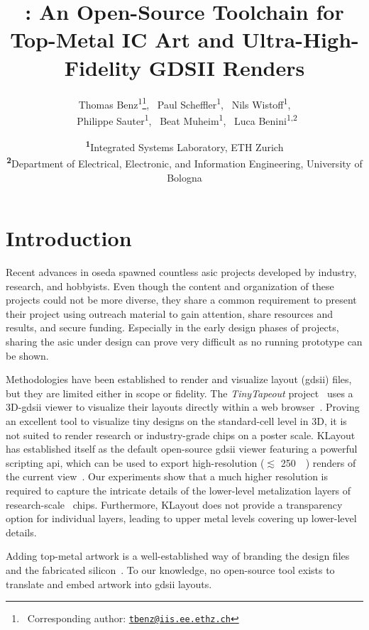 \documentclass[a4paper, 10pt, unnumberedsections, twoside]{LTJournalArticle}
\title{{\artistic}: An Open-Source Toolchain for Top-Metal IC Art and Ultra-High-Fidelity GDSII Renders}
\author{%
    Thomas Benz\textsuperscript{1}\thanks{~Corresponding author: \href{mailto:tbenz@iis.ee.ethz.ch}{\tt tbenz@iis.ee.ethz.ch}}, \
    Paul Scheffler\textsuperscript{1}, \
    Nils Wistoff\textsuperscript{1},\\ \
    Philippe Sauter\textsuperscript{1}, \
    Beat Muheim\textsuperscript{1}, \
    Luca Benini\textsuperscript{1,2}
}
\date{
    \vspace{-0.32em}
    \footnotesize\textsuperscript{\textbf{1}}Integrated Systems Laboratory, ETH Zurich \\
    \footnotesize\textsuperscript{\textbf{2}}Department of Electrical, Electronic, and Information Engineering, University of Bologna
    \vspace{-0.32em}
}
\newcommand{\klayout}{KLayout}
\begin{document}
\maketitle
\glsresetall

\section{Introduction}

Recent advances in \gls{oseda} spawned countless \gls{asic} projects developed by industry, research, and hobbyists.
%
Even though the content and organization of these projects could not be more diverse, they share a common requirement to present their project using outreach material to gain attention, share resources and results, and secure funding.
%
Especially in the early design phases of projects, sharing the \gls{asic} under design can prove very difficult as no running prototype can be shown. 

%
Methodologies have been established to render and visualize layout (\glsunset{gdsii}\gls{gdsii}) files, but they are limited either in scope or fidelity.
%
The \emph{TinyTapeout} project~\cite{venn2024tiny} uses a {3D}-\gls{gdsii} viewer to visualize their layouts directly within a web browser~\cite{mbalestrini2022ttgdsviewer}.
Proving an excellent tool to visualize tiny designs on the standard-cell level in {3D}, it is not suited to render research or industry-grade chips on a poster scale.
%
{\klayout}~\cite{kofferlein2020klayout} has established itself as the default open-source \gls{gdsii} viewer featuring a powerful scripting \gls{api}, which can be used to export high-resolution ($\lesssim$ \SI{250}{\mega\pixel}) renders of the current view~\cite{kofferlein2019screenshot}.
Our experiments show that a much higher resolution is required to capture the intricate details of the lower-level metalization layers of research-scale~\cite{sauter2024insights, scheffler2025occamy} chips.
Furthermore, {\klayout} does not provide a transparency option for individual layers, leading to upper metal levels covering up lower-level details.

Adding top-metal artwork is a well-established way of branding the design files and the fabricated silicon~\cite{goldstein2002secret}.
To our knowledge, no open-source tool exists to translate and embed artwork into \gls{gdsii} layouts.
\end{document}
